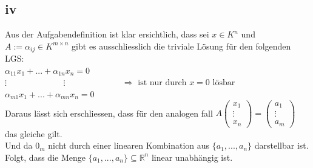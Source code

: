 \documentclass[10pt,a4paper]{article}
\begin{document}
 \subsection{iv}
 Aus der Aufgabendefinition ist klar ersichtlich, dass sei $x \in K^n$ und  $A:=\alpha_{ij} \in K^{m\times n}$ gibt es ausschliesslich die triviale Lösung für den folgenden LGS:\\
 $ \alpha_{11}x_1+...+ \alpha_{1n}x_n = 0 $\\
 $ \vdots \;\;\;\;\;\;\;\;\;\;\;\;\;\;\;\;\;\;\;\;\;\;\;\;  \vdots\;\;\;\;\;\;\;\;\;\;\;\;\;\;\;\;\;\;\;\;\;\;\;\; \Rightarrow \text{ ist nur durch } x = 0 \text{ lösbar}$ \\
 $ \alpha_{m1}x_1+...+ \alpha_{mn}x_n = 0 $\\
 Daraus lässt sich erschliessen, dass für den analogen fall $A\begin{pmatrix} x_1 \\ \vdots \\ x_n \end{pmatrix} = \begin{pmatrix} a_1 \\ \vdots \\ a_m \end{pmatrix}$ das gleiche gilt. \\ 
 Und da $0_m$ nicht durch einer linearen Kombination aus $\{a_1, ... , a_n\}$ darstellbar ist. Folgt, dass die Menge $\{a_1, ... , a_n\} \subseteq \mathbb{R}^n$  linear unabhängig ist.
\end{document}
